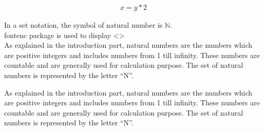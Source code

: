 \documentclass{article}
\begin{document}
\begin{align}
    x=y*2
\end{align}

In a set notation, the symbol of natural number is $\mathbb{N}$.\\
fontenc package is used to display <> \\

\singlespacing
As explained in the introduction part, 
natural numbers are the numbers which are 
positive integers and includes numbers from 1 
till infinity. These numbers are countable 
and are generally used for calculation purpose.  
The set of natural numbers is represented 
by the letter “N”.

\doublespacing
As explained in the introduction part, 
natural numbers are the numbers which are 
positive integers and includes numbers from 1 
till infinity. These numbers are countable 
and are generally used for calculation purpose.  
The set of natural numbers is represented 
by the letter “N”.
\end{document}
